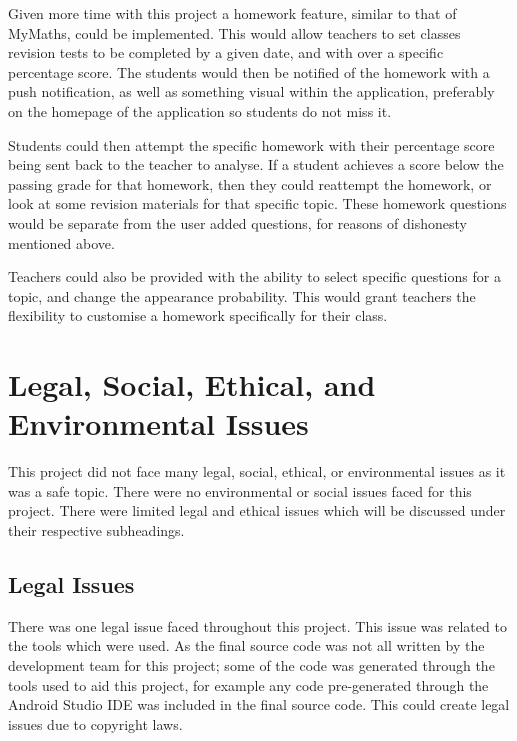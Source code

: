 \documentclass{article}
\begin{document}
Given more time with this project a homework feature, similar to that of MyMaths, could be implemented. This would allow teachers to set classes revision tests to be completed by a given date, and with over a specific percentage score. The students would then be notified of the homework with a push notification, as well as something visual within the application, preferably on the homepage of the application so students do not miss it. \par

Students could then attempt the specific homework with their percentage score being sent back to the teacher to analyse. If a student achieves a score below the passing grade for that homework, then they could reattempt the homework, or look at some revision materials for that specific topic. These homework questions would be separate from the user added questions, for reasons of dishonesty mentioned above. \par

Teachers could also be provided with the ability to select specific questions for a topic, and change the appearance probability. This would grant teachers the flexibility to customise a homework specifically for their class. \par

\section{Legal, Social, Ethical, and Environmental Issues}
\label{section:issues}

This project did not face many legal, social, ethical, or environmental issues as it was a safe topic. There were no environmental or social issues faced for this project. There were limited legal and ethical issues which will be discussed under their respective subheadings. 

\subsection{Legal Issues}

There was one legal issue faced throughout this project. This issue was related to the tools which were used. As the final source code was not all written by the development team for this project; some of the code was generated through the tools used to aid this project, for example any code pre-generated through the Android Studio IDE was included in the final source code. This could create legal issues due to copyright laws. \par
\end{document}
